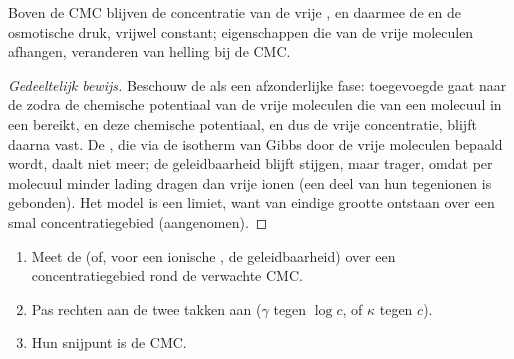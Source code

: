 \begin{proposition}\label{prop:b3:colloids:cmc-break}
Boven de CMC blijven de concentratie van de vrije , en daarmee de  en de osmotische druk, vrijwel
constant; eigenschappen die van de vrije moleculen afhangen, veranderen
van helling bij de CMC.
\end{proposition}

\begin{proof}[Gedeeltelijk bewijs]
Beschouw de  als een afzonderlijke fase: toegevoegde
 gaat naar de  zodra de chemische
potentiaal van de vrije moleculen die van een molecuul in een 
bereikt, en deze chemische potentiaal, en dus de vrije concentratie,
blijft daarna vast. De , die via de isotherm van Gibbs
door de vrije moleculen bepaald wordt, daalt niet meer; de geleidbaarheid
blijft stijgen, maar trager, omdat  per molecuul minder lading
dragen dan vrije ionen (een deel van hun tegenionen is gebonden). Het
model is een limiet, want  van eindige grootte ontstaan over een
smal concentratiegebied (aangenomen).
\end{proof}

\begin{method}\label{met:b3:colloids:cmc}
\begin{enumerate}
  \item Meet de  (of, voor een ionische
        , de geleidbaarheid) over een
        concentratiegebied rond de verwachte CMC.
  \item Pas rechten aan de twee takken aan ($\gamma$ tegen $\log c$, of $\kappa$ tegen $c$).
  \item Hun snijpunt is de CMC.
\end{enumerate}
\end{method}

